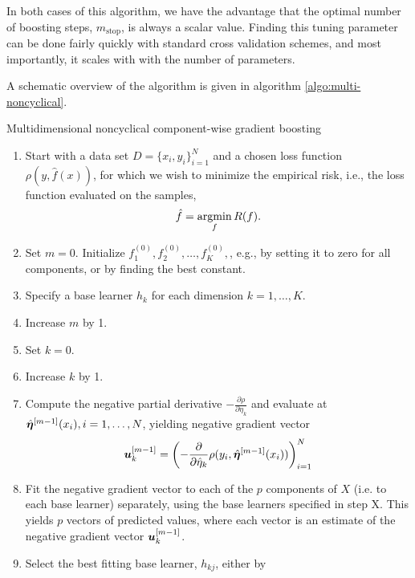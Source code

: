 In both cases of this algorithm, we have the advantage that the optimal number of boosting steps, $m_{\text{stop}}$, is always a scalar value.
Finding this tuning parameter can be done fairly quickly with standard cross validation schemes, and most importantly, it scales with with the number of parameters.

A schematic overview of the algorithm is given in algorithm \ref{algo:multi-noncyclical}.

\begin{algorithm}
\caption{Multidimensional noncyclical component-wise gradient boosting}
\label{algo:multi-noncyclical}
\begin{enumerate}
    \item Start with a data set $D=\{x_i, y_i\}_{i=1}^N$ and a chosen loss function $\rho(y,\hat{f}(x))$, for which we wish to
        minimize the empirical risk, i.e., the loss function evaluated on the samples,
        \begin{equation*}
            \hat{f}=\operatorname*{argmin}_{f}R(f).
        \end{equation*}
    \item Set $m=0$. Initialize $f^{(0)}_1,f^{(0)}_2,\ldots,f^{(0)}_K,$, e.g., by setting it to zero for all components, or by finding the best constant.%
    \item Specify a base learner $h_k$ for each dimension $k=1,\ldots,K$.
    \item Increase $m$ by 1.
    \item Set $k=0$.
    \item Increase $k$ by 1.
    \item Compute the negative partial derivative $-\frac{\partial\rho}{\partial \eta_k}$
        and evaluate at $\hat{\boldsymbol{\eta}}^{[m-1]}(x_i),i=1,\ldots,N$, yielding negative gradient vector
        \begin{equation*}
            \bm{u}^{[m-1]}_k=\left(-\frac{\partial}{\partial \hat{\eta}_k}\rho(y_i, \hat{\boldsymbol{\eta}}^{[m-1]}(x_i))\right)_{i=1}^N
        \end{equation*}
    \item Fit the negative gradient vector to each of the $p$ components of $X$ (i.e. to each base learner) separately, using the base learners specified in step X. This yields $p$ vectors of predicted values, where each vector is an estimate of the negative gradient vector $\bm{u}^{[m-1]}_k$.
    \item Select the best fitting base learner, $h_{kj}$, either by

\end{enumerate}
\end{algorithm}
